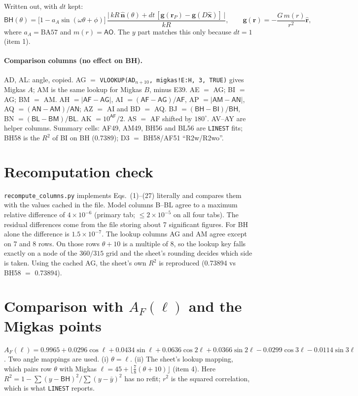 \documentclass[10pt]{article}
\newcommand{\cl}[1]{\mathsf{#1}}
\begin{document}
Written out, with $dt$ kept:
\begin{equation}
\cl{BH}(\theta)=\bigl[1-a_A\sin(\omega\theta+\phi)\bigr]\,
\frac{\bigl|\,kR\,\hat{\mathbf n}(\theta)+dt\,[\mathbf g(\mathbf r_P)-\mathbf g(D\hat{\mathbf x})]\,\bigr|}{kR},
\qquad \mathbf g(\mathbf r)=-\frac{G\,m(r)}{r^2}\hat{\mathbf r},
\end{equation}
where $a_A=\mathrm{BA57}$ and $m(r)=\cl{AO}$. The $y$ part matches this only because $dt=1$ (item 1).

\paragraph{Comparison columns (no effect on BH).}
AD, AL: angle, copied. AG $=$ \texttt{VLOOKUP(AD$_{n+10}$, migkas!E:H, 3, TRUE)} gives Migkas $A$; AM is the same lookup for Migkas $B$, minus E39.
AE $=$ AG; BI $=$ AG; BM $=$ AM. AH $=|\cl{AF}-\cl{AG}|$, AI $=(\cl{AF}-\cl{AG})/\cl{AF}$, AP $=|\cl{AM}-\cl{AN}|$, AQ $=(\cl{AN}-\cl{AM})/\cl{AN}$; AZ $=$ AI and BD $=$ AQ.
BJ $=(\cl{BH}-\cl{BI})/\cl{BH}$, BN $=(\cl{BL}-\cl{BM})/\cl{BL}$. AK $=10^{\cl{AF}}/2$. AS $=$ AF shifted by $180^\circ$.
AV--AY are helper columns. Summary cells: AF49, AM49, BH56 and BL56 are \texttt{LINEST} fits; BH58 is the $R^2$ of BI on BH (0.7389); D3 $=$ BH58/AF51 ``R2w/R2wo''.

\section{Recomputation check}
\texttt{recompute\_columns.py} implements Eqs.~(1)--(27) literally and compares them with the values cached in the file.
Model columns B--BL agree to a maximum relative difference of $4\times10^{-6}$ (primary tab; $\le 2\times10^{-5}$ on all four tabs).
The residual differences come from the file storing about 7 significant figures. For BH alone the difference is $1.5\times10^{-7}$.
The lookup columns AG and AM agree except on 7 and 8 rows. On those rows $\theta+10$ is a multiple of 8, so the lookup key falls
exactly on a node of the $360/315$ grid and the sheet's rounding decides which side is taken. Using the cached AG, the sheet's own $R^2$ is reproduced (0.73894 vs BH58 $=$ 0.73894).

\section{Comparison with $A_F(\ell)$ and the Migkas points}
$A_F(\ell)=0.9965+0.0296\cos\ell+0.0434\sin\ell+0.0636\cos2\ell+0.0366\sin2\ell-0.0299\cos3\ell-0.0114\sin3\ell$.
Two angle mappings are used. (i) $\theta=\ell$. (ii) The sheet's lookup mapping, which pairs row $\theta$ with Migkas
$\ell=45+\lfloor\tfrac78(\theta+10)\rfloor$ (item 4). Here $R^2=1-\sum(y-\cl{BH})^2/\sum(y-\bar y)^2$ has no refit;
$r^2$ is the squared correlation, which is what \texttt{LINEST} reports.
\end{document}
